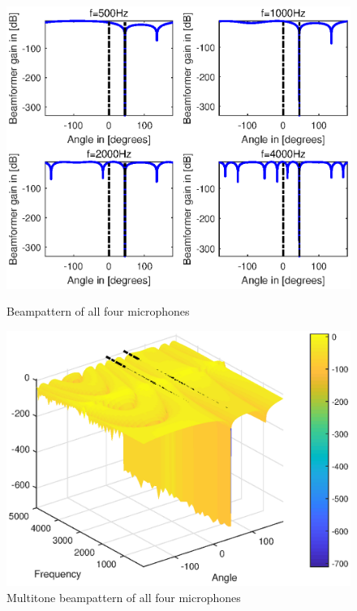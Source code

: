 \documentclass[onecolumn, conference]{IEEEtran}
\begin{document}
\begin{figure}[htbp]
	\begin{minipage}[b]{0.5\linewidth}
		\centerline{\includegraphics[width=1\textwidth]{img/1_b_3.eps}}
		\caption{Beampattern of all four microphones}
		\label{Beampattern of all four microphones45}
	\end{minipage}
	\hfill
	\begin{minipage}[b]{0.5\linewidth}
		\centerline{\includegraphics[width=1\textwidth]{img/1_a_3_multi_45.eps}}
		\caption{Multitone beampattern of all four microphones}
		\label{Multitone beampattern of all four microphones45}
	\end{minipage}
\end{figure}
\end{document}
